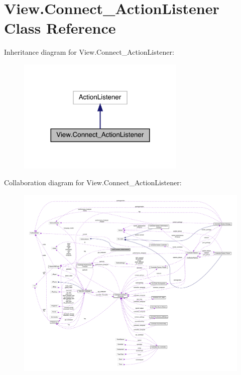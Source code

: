 \hypertarget{class_view_1_1_connect___action_listener}{}\section{View.\+Connect\+\_\+\+Action\+Listener Class Reference}
\label{class_view_1_1_connect___action_listener}


Inheritance diagram for View.\+Connect\+\_\+\+Action\+Listener\+:
\nopagebreak
\begin{figure}[H]
\begin{center}
\leavevmode
\includegraphics[width=227pt]{class_view_1_1_connect___action_listener__inherit__graph}
\end{center}
\end{figure}


Collaboration diagram for View.\+Connect\+\_\+\+Action\+Listener\+:
\nopagebreak
\begin{figure}[H]
\begin{center}
\leavevmode
\includegraphics[width=350pt]{class_view_1_1_connect___action_listener__coll__graph}
\end{center}
\end{figure}
